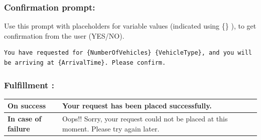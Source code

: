 \subsubsection{Confirmation prompt:}
Use this prompt with placeholders for variable values (indicated using \{\} ), to get confirmation from the user (YES/NO).





\begin{lstlisting}[caption={Code snippet}]
You have requested for {NumberOfVehicles} {VehicleType}, and you will be arriving at {ArrivalTime}. Please confirm.
\end{lstlisting}

\subsubsection{Fulfillment :}

\begin{table}[h]
\centering
\begin{tabular}{|m{4cm}|m{7cm}|}
\hline
\textbf{On success} & Your request has been placed successfully. \\
\hline
\textbf{In case of failure} & Oops!! Sorry, your request could not be placed at this moment. Please try again later. \\
\hline
\end{tabular}
\end{table}
\newpage
